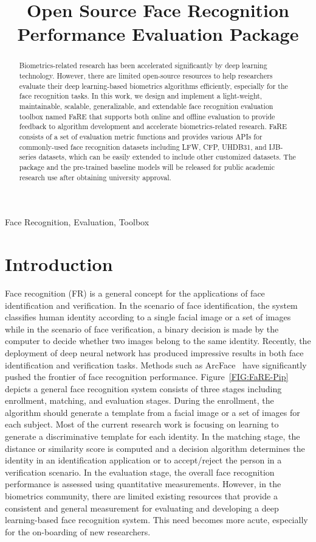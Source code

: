 \documentclass{article}
\title{Open Source Face Recognition Performance Evaluation Package}
\begin{document}
%
\maketitle
%
\begin{abstract}
Biometrics-related research has been accelerated significantly by deep learning technology.
However, there are limited open-source resources to help researchers evaluate their deep learning-based biometrics algorithms efficiently, especially for the face recognition tasks.
In this work, we design and implement a light-weight, maintainable, scalable, generalizable, and extendable face recognition evaluation toolbox named FaRE that supports both online and offline evaluation to provide feedback to algorithm development and accelerate biometrics-related research.
FaRE consists of a set of evaluation metric functions and provides various APIs for commonly-used face recognition datasets including LFW, CFP, UHDB31, and IJB-series datasets, which can be easily extended to include other customized datasets.
The package and the pre-trained baseline models will be released for public academic research use after obtaining university approval.
\end{abstract}
%
\begin{keywords}
Face Recognition, Evaluation, Toolbox
\end{keywords}
%
\section{Introduction}
\label{SEC:FaRE-Intro}
Face recognition (FR) is a general concept for the applications of face identification and verification. 
In the scenario of face identification, the system classifies human identity according to a single facial image or a set of images while in the scenario of face verification, a binary decision is made by the computer to decide whether two images belong to the same identity. 
Recently, the deployment of deep neural network has produced impressive results in both face identification and verification tasks. 
Methods such as ArcFace~\cite{Deng_2018_180917} have significantly pushed the frontier of face recognition performance. 
Figure~\ref{FIG:FaRE-Pip} depicts a general face recognition system consists of three stages including enrollment, matching, and evaluation stages.
During the enrollment, the algorithm should generate a template from a facial image or a set of images for each subject.
Most of the current research work is focusing on learning to generate a discriminative template for each identity.
In the matching stage, the distance or similarity score is computed and a decision algorithm determines the identity in an identification application or to accept/reject the person in a verification scenario.
In the evaluation stage, the overall face recognition performance is assessed using quantitative measurements.
However, in the biometrics community, there are limited existing resources that provide a consistent and general measurement for evaluating and developing a deep learning-based face recognition system.
This need becomes more acute, especially for the on-boarding of new researchers.
\end{document}
